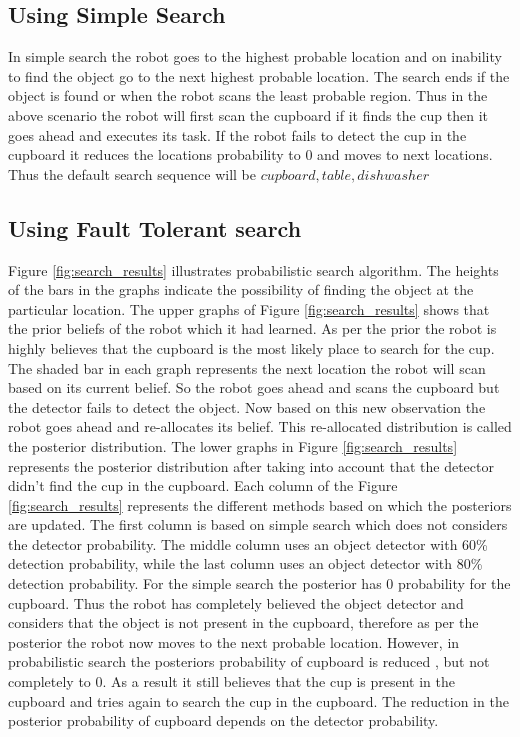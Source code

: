  \FloatBarrier
\subsection{Using Simple Search}

In simple search the robot goes to the highest probable location and on inability to find the object go to the next highest probable location. The search ends if the object is found or when the robot scans the least probable region. Thus in the above scenario the robot will first scan the cupboard if it finds the cup then it goes ahead and executes its task. If the robot fails to detect the cup in the cupboard it reduces the locations probability to $0$ and moves to next locations. Thus the default search sequence will be ${cupboard, table, dishwasher}$

\subsection{Using Fault Tolerant search}

Figure \ref{fig:search_results} illustrates probabilistic search algorithm. The heights of the bars in the graphs indicate the possibility of finding the object at the particular location. The upper graphs of Figure \ref{fig:search_results} shows that the prior beliefs of the robot which it had learned. As per the prior the robot is highly believes that the cupboard is the most likely place to search for the cup. The shaded bar in each graph represents the next location the robot will scan based on its current belief. So the robot goes ahead and scans the cupboard but the detector fails to detect the object. Now based on this new observation the robot goes ahead and re-allocates its belief. This re-allocated distribution is called the posterior distribution. The lower graphs in Figure \ref{fig:search_results} represents the posterior distribution after taking into account that the detector didn’t find the cup in the cupboard. Each column of the Figure \ref{fig:search_results} represents the different methods based on which the posteriors are updated. The first column is based on simple search which does not considers the detector probability. The middle column uses an object detector with 60\% detection probability, while the last column uses an object detector with 80\% detection probability. For the simple search the posterior has $0$ probability for the cupboard. Thus the robot has completely believed the object detector and considers that the object is not present in the cupboard, therefore as per the posterior the robot now moves to the next probable location. However, in probabilistic search the posteriors probability of cupboard is reduced , but not completely to $0$. As a result it still believes that the cup is present in the cupboard and tries again to search the cup in the cupboard. The reduction in the posterior probability of cupboard depends on the detector probability. 

